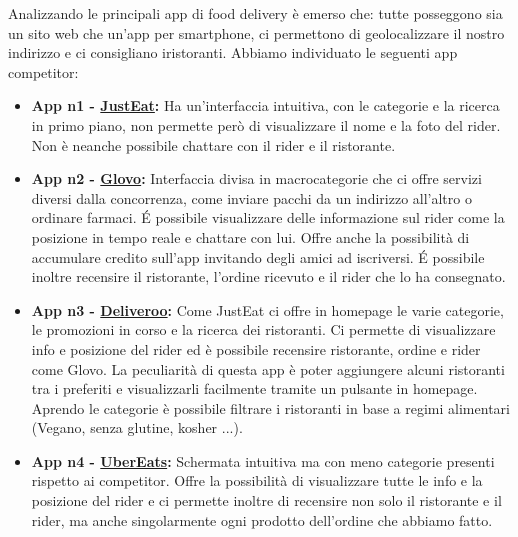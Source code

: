 \documentclass{article}
\begin{document}
     \par
    Analizzando le principali app di food delivery è emerso che: tutte posseggono sia un sito web che un'app per smartphone, ci permettono di geolocalizzare il nostro indirizzo e ci consigliano iristoranti.
    Abbiamo individuato le seguenti app competitor:
\begin{itemize}
        \item \textbf{App n1 - \href{https://www.justeat.it}{JustEat}:} Ha un’interfaccia intuitiva, con le categorie e la ricerca in primo piano, non permette però di visualizzare il nome e la foto del rider. Non è neanche possibile chattare con il rider e il ristorante.

        \item \textbf{App n2 - \href{https://glovoapp.com/it/it/}{Glovo}:} Interfaccia divisa in macrocategorie che ci offre servizi diversi dalla concorrenza, come inviare pacchi da un indirizzo all’altro o ordinare farmaci. É possibile visualizzare delle informazione sul rider come la posizione in tempo reale e chattare con lui. Offre anche la possibilità di accumulare credito sull’app invitando degli amici ad iscriversi. É possibile inoltre recensire il ristorante, l’ordine ricevuto e il rider che lo ha consegnato.

        \item \textbf{App n3 - \href{https://deliveroo.it/it/}{Deliveroo}:} Come JustEat ci offre in homepage le varie categorie, le promozioni in corso e la ricerca dei ristoranti. Ci permette di visualizzare info e posizione del rider ed è possibile recensire ristorante, ordine e rider come Glovo. La peculiarità di questa app è poter aggiungere alcuni ristoranti tra i preferiti e visualizzarli facilmente tramite un pulsante in homepage. Aprendo le categorie è possibile filtrare i ristoranti in base a regimi alimentari (Vegano, senza glutine, kosher ...).

        \item \textbf{App n4 - \href{https://www.ubereats.com/it/}{UberEats}:} Schermata intuitiva ma con meno categorie presenti rispetto ai competitor. Offre la possibilità di visualizzare tutte le info e la posizione del rider e ci permette inoltre di recensire non solo il ristorante e il rider, ma anche singolarmente ogni prodotto dell’ordine che abbiamo fatto.

\end{itemize}
\end{document}
